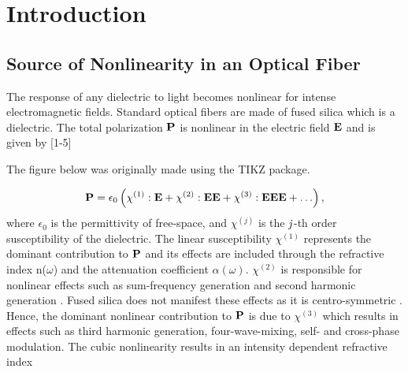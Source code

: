 
\renewcommand{\thechapter}{1}

\chapter{Introduction}

\section{Source of Nonlinearity in an Optical Fiber}

The response of any dielectric to light becomes nonlinear for
intense electromagnetic fields.  Standard optical fibers are made
of fused silica which is a dielectric. The total polarization
$\bf{P}$ is nonlinear in the electric field $\bf{E}$ and is given
by [1-5]

The figure below was originally made using the TIKZ package.

\begin{center}
\end{center}



\begin{equation}
{\bf P} = \epsilon_{0} \left( \chi^{(1)} : {\bf E} + \chi^{(2)}
: {\bf EE} + \chi^{(3)} : {\bf EEE} + \ldots \right),
\end{equation}
where $\epsilon_0$ is the permittivity of free-space, and
$\chi^{(j)}$
is the ${\it j}$-th order susceptibility of the dielectric. The linear
susceptibility $\chi^{(1)}$ represents the dominant contribution to
$\bf{P}$ and its effects are included through the refractive index
n($\omega$) and the attenuation coefficient $\alpha(\omega)$. $\chi^{(2)}$
is responsible for nonlinear effects such as sum-frequency generation and
second harmonic generation \cite{Agrawal1, Shen}. Fused silica does not
manifest these effects as it is centro-symmetric \cite{Newell}. Hence, the dominant nonlinear
contribution to ${\bf P}$ is due to $\chi^{(3)}$ which results in effects
such as third harmonic generation, four-wave-mixing,  self- and
cross-phase modulation. The cubic nonlinearity results in an intensity
dependent refractive index

